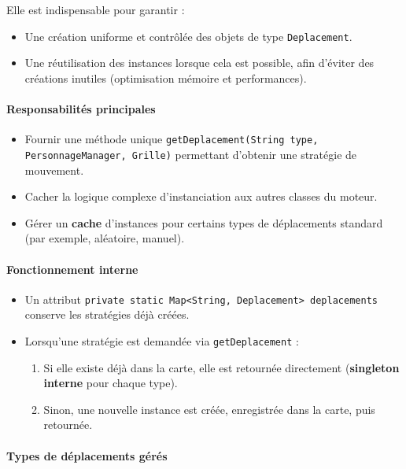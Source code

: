 Elle est indispensable pour garantir :
\begin{itemize}
    \item Une création uniforme et contrôlée des objets de type \texttt{Deplacement}.
    \item Une réutilisation des instances lorsque cela est possible, afin d’éviter des créations inutiles (optimisation mémoire et performances).
\end{itemize}

\paragraph{Responsabilités principales}
\begin{itemize}
    \item Fournir une méthode unique \texttt{getDeplacement(String type, PersonnageManager, Grille)} permettant d’obtenir une stratégie de mouvement.
    \item Cacher la logique complexe d’instanciation aux autres classes du moteur.
    \item Gérer un \textbf{cache} d’instances pour certains types de déplacements standard (par exemple, aléatoire, manuel).
\end{itemize}

\vspace{1em}
\paragraph{Fonctionnement interne}

\begin{itemize}
    \item Un attribut \texttt{private static Map<String, Deplacement> deplacements} conserve les stratégies déjà créées.
    \item Lorsqu'une stratégie est demandée via \texttt{getDeplacement} :
    \begin{enumerate}
        \item Si elle existe déjà dans la carte, elle est retournée directement (\textbf{singleton interne} pour chaque type).
        \item Sinon, une nouvelle instance est créée, enregistrée dans la carte, puis retournée.
    \end{enumerate}
\end{itemize}

\vspace{1em}
\paragraph{Types de déplacements gérés}

